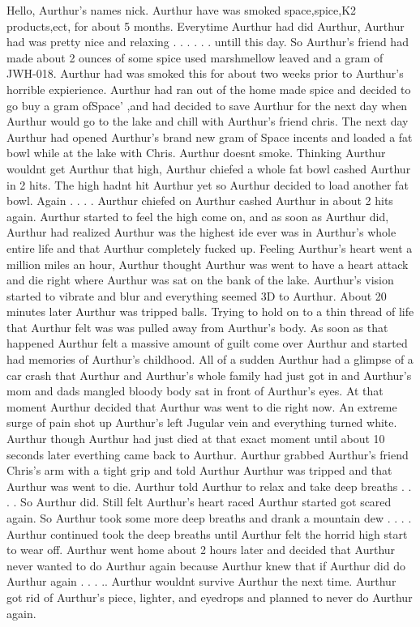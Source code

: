 \documentclass[12pt]{book}
\begin{document}
Hello, Aurthur's names nick. Aurthur have was smoked space,spice,K2 products,ect, for about 5 months. Everytime Aurthur had did Aurthur, Aurthur had was pretty nice and relaxing . . .   . . .  untill this day. So Aurthur's friend had made about 2 ounces of some spice used marshmellow leaved and a gram of JWH-018. Aurthur had was smoked this for about two weeks prior to Aurthur's horrible expierience. Aurthur had ran out of the home made spice and decided to go buy a gram ofSpace' ,and had decided to save Aurthur for the next day when Aurthur would go to the lake and chill with Aurthur's friend chris. The next day Aurthur had opened Aurthur's brand new gram of Space incents and loaded a fat bowl while at the lake with Chris. Aurthur doesnt smoke. Thinking Aurthur wouldnt get Aurthur that high, Aurthur chiefed a whole fat bowl cashed Aurthur in 2 hits. The high hadnt hit Aurthur yet so Aurthur decided to load another fat bowl. Again . . .  . Aurthur chiefed on Aurthur cashed Aurthur in about 2 hits again. Aurthur started to feel the high come on, and as soon as Aurthur did, Aurthur had realized Aurthur was the highest ide ever was in Aurthur's whole entire life and that Aurthur completely fucked up. Feeling Aurthur's heart went a million miles an hour, Aurthur thought Aurthur was went to have a heart attack and die right where Aurthur was sat on the bank of the lake. Aurthur's vision started to vibrate and blur and everything seemed 3D to Aurthur. About 20 minutes later Aurthur was tripped balls. Trying to hold on to a thin thread of life that Aurthur felt was was pulled away from Aurthur's body. As soon as that happened Aurthur felt a massive amount of guilt come over Aurthur and started had memories of Aurthur's childhood. All of a sudden Aurthur had a glimpse of a car crash that Aurthur and Aurthur's whole family had just got in and Aurthur's mom and dads mangled bloody body sat in front of Aurthur's eyes. At that moment Aurthur decided that Aurthur was went to die right now. An extreme surge of pain shot up Aurthur's left Jugular vein and everything turned white. Aurthur though Aurthur had just died at that exact moment until about 10 seconds later everthing came back to Aurthur. Aurthur grabbed Aurthur's friend Chris's arm with a tight grip and told Aurthur Aurthur was tripped and that Aurthur was went to die. Aurthur told Aurthur to relax and take deep breaths . . .  . So Aurthur did. Still felt Aurthur's heart raced Aurthur started got scared again. So Aurthur took some more deep breaths and drank a mountain dew . . .  . Aurthur continued took the deep breaths until Aurthur felt the horrid high start to wear off. Aurthur went home about 2 hours later and decided that Aurthur never wanted to do Aurthur again because Aurthur knew that if Aurthur did do Aurthur again . . . .. Aurthur wouldnt survive Aurthur the next time. Aurthur got rid of Aurthur's piece, lighter, and eyedrops and planned to never do Aurthur again.
\end{document}
